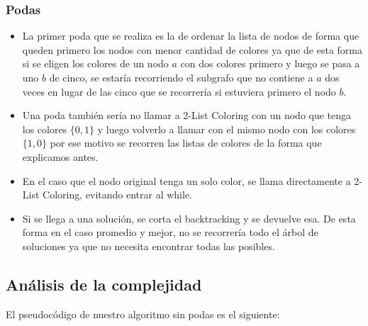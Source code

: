 \subsubsection{Podas}

\begin{itemize}
	\item La primer poda que se realiza es la de ordenar la lista de nodos de forma que queden primero los nodos con menor cantidad de colores ya que de esta forma si se eligen los colores de un nodo $a$ con dos colores primero y luego se pasa a uno $b$ de cinco, se estaría recorriendo el subgrafo que no contiene a $a$ dos veces en lugar de las cinco que se recorrería si estuviera primero el nodo $b$.
	\item Una poda también sería no llamar a 2-List Coloring con un nodo que tenga los colores $\{0, 1\}$ y luego volverlo a llamar con el mismo nodo con los colores $\{1, 0\}$ por ese motivo se recorren las listas de colores de la forma que explicamos antes.
	\item En el caso que el nodo original tenga un solo color, se llama directamente a 2-List Coloring, evitando entrar al while.
	\item Si se llega a una solución, se corta el backtracking y se devuelve esa. De esta forma en el caso promedio y mejor, no se recorrería todo el árbol de soluciones ya que no necesita encontrar todas las posibles.
\end{itemize}

\subsection{Análisis de la complejidad} 
El pseudocódigo de nuestro algoritmo sin podas es el siguiente:

